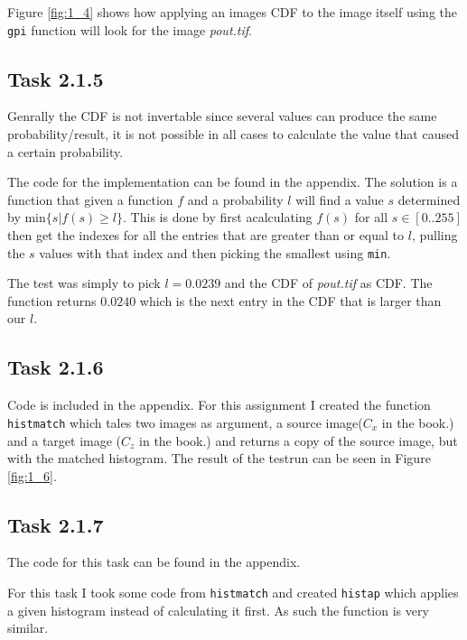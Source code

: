 Figure \ref{fig:1_4} shows how applying an images CDF to the image itself using
the \texttt{gpi} function will look for the image \textit{pout.tif}.

\subsection{Task 2.1.5}
Genrally the CDF is not invertable since several values can produce the same
probability/result, it is not possible in all cases to calculate the value that
caused a certain probability.

The code for the implementation can be found in the appendix. The solution is a
function that given a function $f$ and a probability $l$ will find a value $s$
determined by $\text{min}\{s | f(s) \geq l \}$. This is done by first
acalculating $f(s)$ for all $s \in [0..255]$ then get the indexes for all the
entries that are greater than or equal to $l$, pulling the $s$ values with that
index and then picking the smallest using \texttt{min}.

The test was simply to pick $l = 0.0239$ and the CDF of \textit{pout.tif} as
CDF. The function returns $0.0240$ which is the next entry in the CDF that is
larger than our $l$.


\subsection{Task 2.1.6}
Code is included in the appendix. For this assignment I created the function
\texttt{histmatch} which tales two images as argument, a source image($C_x$ in
the book.) and a target image ($C_z$ in the book.) and returns a copy of the
source image, but with the matched histogram.  The result of the testrun can be
seen in Figure \ref{fig:1_6}.



\subsection{Task 2.1.7}
The code for this task can be found in the appendix.


For this task I took some code from \texttt{histmatch} and created
\texttt{histap} which applies a given histogram instead of calculating it
first. As such the function is very similar.


